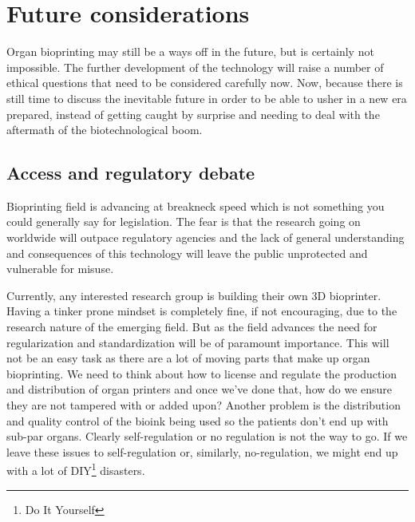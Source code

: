 \documentclass[12pt]{article} %
\begin{document}
\newpage 


\section{Future considerations} %

Organ bioprinting may still be a ways off in the future, but is certainly not impossible. The further development of the technology will raise a number of ethical questions that need to be considered carefully now. Now, because there is still time to discuss the inevitable future in order to be able to usher in a new era prepared, instead of getting caught by surprise and needing to deal with the aftermath of the biotechnological boom. 


\subsection{Access and regulatory debate} %

Bioprinting field is advancing at breakneck speed which is not something you could generally say for legislation. The fear is that the research going on worldwide will outpace regulatory agencies and the lack of general understanding and consequences of this technology will leave the public unprotected and vulnerable for misuse. 

Currently, any interested research group is building their own 3D bioprinter. Having a tinker prone mindset is completely fine, if not encouraging, due to the research nature of the emerging field. But as the field advances the need for regularization and standardization will be of paramount importance. This will not be an easy task as there are a lot of moving parts that make up organ bioprinting. We need to think about how to license and regulate the production and distribution of organ printers and once we've done that, how do we ensure they are not tampered with or added upon? 
Another problem is the distribution and quality control of the bioink being used so the patients don't end up with sub-par organs. Clearly self-regulation or no regulation is not the way to go. If we leave these issues to self-regulation or, similarly, no-regulation, we might end up with a lot of DIY\footnote{Do It Yourself} disasters. 
\end{document}

